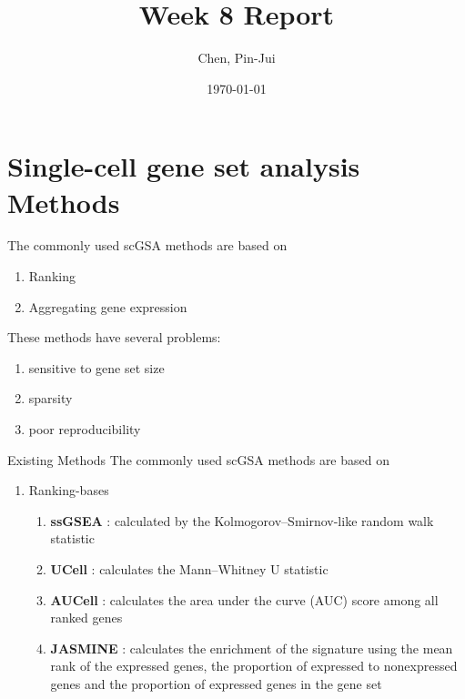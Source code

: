 \documentclass[12pt, aspectratio=43]{beamer}
\title[\textbf{Week 8 Report}]{Week 8 Report}
\author[Chen, Pin-Jui]{Chen, Pin-Jui}
\date{\today}
\begin{document}
	
	\begin{frame}
		\titlepage
	\end{frame}
	

	
	\begin{frame}
		\tableofcontents[currentsection,]
	\end{frame}
	
	\section{Single-cell gene set analysis Methods}
	
	\begin{frame}
		The commonly used scGSA methods are based on
		\begin{enumerate}
			\item Ranking
			\item Aggregating gene expression
		\end{enumerate}
		These methods have several problems:
		\begin{enumerate}
			\item sensitive to gene set size
			\item sparsity
			\item poor reproducibility
		\end{enumerate}
		
	\end{frame}
	
	\begin{frame}{Existing Methods}
		The commonly used scGSA methods are based on
		\begin{enumerate}
			\item Ranking-bases
			\begin{enumerate}
				\item \textbf{ssGSEA} : calculated by the Kolmogorov–Smirnov-like random walk statistic
				\item \textbf{UCell} : calculates the Mann–Whitney U statistic
				\item \textbf{AUCell} : calculates the area under the curve (AUC) score among all ranked genes
				\item \textbf{JASMINE} : calculates the enrichment of the signature using the mean rank of the expressed genes, the proportion of expressed to nonexpressed genes and the proportion of expressed genes in the gene set
			\end{enumerate}
			
		\end{enumerate}
		
		
	\end{frame}
	
\end{document}
